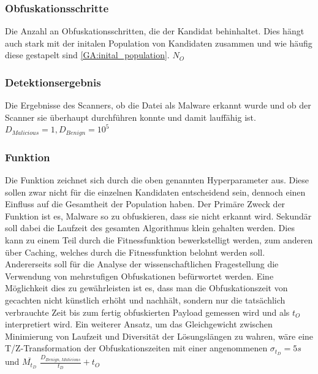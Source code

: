     \subsubsection{Obfuskationsschritte}
    Die Anzahl an Obfuskationsschritten, die der Kandidat behinhaltet. Dies hängt auch stark mit der initalen Population von Kandidaten zusammen und wie häufig diese gestapelt sind \ref{GA:inital_population}. $N_O$
    
    \subsubsection{Detektionsergebnis}
    Die Ergebnisse des Scanners, ob die Datei als Malware erkannt wurde und ob der Scanner sie überhaupt durchführen konnte und damit lauffähig ist. $D_{Malicious}=1, D_{Benign}=10^5$
    
    \subsubsection{Funktion}
    Die Funktion zeichnet sich durch die oben genannten Hyperparameter aus. Diese sollen zwar nicht für die einzelnen Kandidaten entscheidend sein, dennoch einen Einfluss auf die Gesamtheit der Population haben.
    Der Primäre Zweck der Funktion ist es, Malware so zu obfuskieren, dass sie nicht erkannt wird. Sekundär soll dabei die Laufzeit des gesamten Algorithmus klein gehalten werden. Dies kann zu einem Teil durch die Fitnessfunktion bewerkstelligt werden, zum anderen über Caching, welches durch die Fitnessfunktion belohnt werden soll. Andererseits soll für die Analyse der wissenschaftlichen Fragestellung die Verwendung von mehrstufigen Obfuskationen befürwortet werden. Eine Möglichkeit dies zu gewährleisten ist es, dass man die Obfuskationszeit von gecachten nicht künstlich erhöht und nachhält, sondern nur die tatsächlich verbrauchte Zeit bis zum fertig obfuskierten Payload gemessen wird und als $t_O$ interpretiert wird.
    Ein weiterer Ansatz, um das Gleichgewicht zwischen Minimierung von Laufzeit und Diversität der Lösungslängen zu wahren, wäre eine T/Z-Transformation der Obfuskationszeiten mit einer angenommenen $\sigma _{t_D}=5s$ und $\overline{M_{t_D}}$
    $\frac{D_{Benign, Malicious}}{t_D}+t_O$
